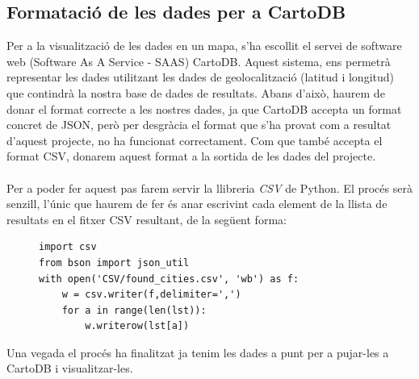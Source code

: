 \documentclass[12pt,a4paper,openright,oneside]{article}
\numberwithin{equation}{section}
\theoremstyle{definition}
\begin{document}
\subsection{Formatació de les dades per a CartoDB}
Per a la visualització de les dades en un mapa, s'ha escollit el servei de software web (Software As A Service - SAAS) CartoDB. Aquest sistema, ens permetrà representar les dades utilitzant les dades de geolocalització (latitud i longitud) que contindrà la nostra base de dades de resultats. Abans d'això, haurem de donar el format correcte a les nostres dades, ja que CartoDB accepta un format concret de JSON, però per desgràcia el format que s'ha provat com a resultat d'aquest projecte, no ha funcionat correctament. Com que també accepta el format CSV, donarem aquest format a la sortida de les dades del projecte.\\
\\
Per a poder fer aquest pas farem servir la llibreria \emph{CSV} de Python. El procés serà senzill, l'únic que haurem de fer és anar escrivint cada element de la llista de resultats en el fitxer CSV resultant, de la següent forma:

\begin{figure}[!htbp]
\begin{verbatim}
import csv
from bson import json_util
with open('CSV/found_cities.csv', 'wb') as f:
    w = csv.writer(f,delimiter=',')
    for a in range(len(lst)):
        w.writerow(lst[a])
\end{verbatim}
\end{figure}

Una vegada el procés ha finalitzat ja tenim les dades a punt per a pujar-les a CartoDB i visualitzar-les.
\end{document}
